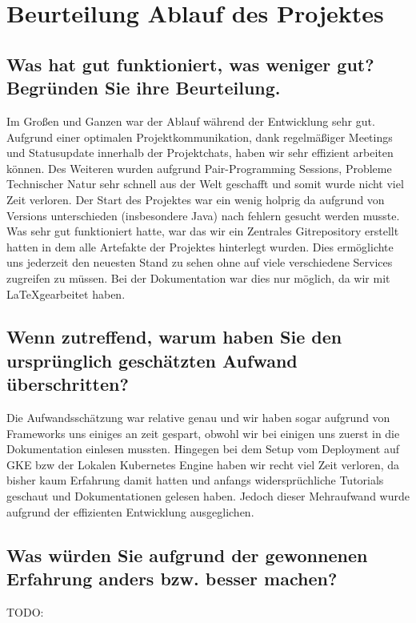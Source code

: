 \section{Beurteilung Ablauf des Projektes}

\subsection{Was hat gut funktioniert, was weniger gut? Begründen Sie ihre Beurteilung.}

Im Großen und Ganzen war der Ablauf während der Entwicklung sehr gut. Aufgrund einer optimalen Projektkommunikation, dank regelmäßiger Meetings und Statusupdate innerhalb der Projektchats, haben wir sehr effizient arbeiten können. Des Weiteren wurden aufgrund Pair-Programming Sessions, Probleme Technischer Natur sehr schnell aus der Welt geschafft und somit wurde nicht viel Zeit verloren. Der Start des Projektes war ein wenig holprig da aufgrund von Versions unterschieden (insbesondere Java) nach fehlern gesucht werden musste. Was sehr gut funktioniert hatte, war das wir ein Zentrales Gitrepository erstellt hatten in dem alle Artefakte der Projektes hinterlegt wurden. Dies ermöglichte uns jederzeit den neuesten Stand zu sehen ohne auf viele verschiedene Services zugreifen zu müssen. Bei der Dokumentation war dies nur möglich, da wir mit \LaTeX gearbeitet haben.

\subsection{Wenn zutreffend, warum haben Sie den ursprünglich geschätzten Aufwand überschritten?}

Die Aufwandsschätzung war relative genau und wir haben sogar aufgrund von Frameworks uns einiges an zeit gespart, obwohl wir bei einigen uns zuerst in die Dokumentation einlesen mussten. Hingegen bei dem Setup vom Deployment auf GKE bzw der Lokalen Kubernetes Engine haben wir recht viel Zeit verloren, da bisher kaum Erfahrung damit hatten und anfangs widersprüchliche Tutorials geschaut und Dokumentationen gelesen haben. Jedoch dieser Mehraufwand wurde aufgrund der effizienten Entwicklung ausgeglichen.

\subsection{Was würden Sie aufgrund der gewonnenen Erfahrung anders bzw. besser machen?}

TODO: